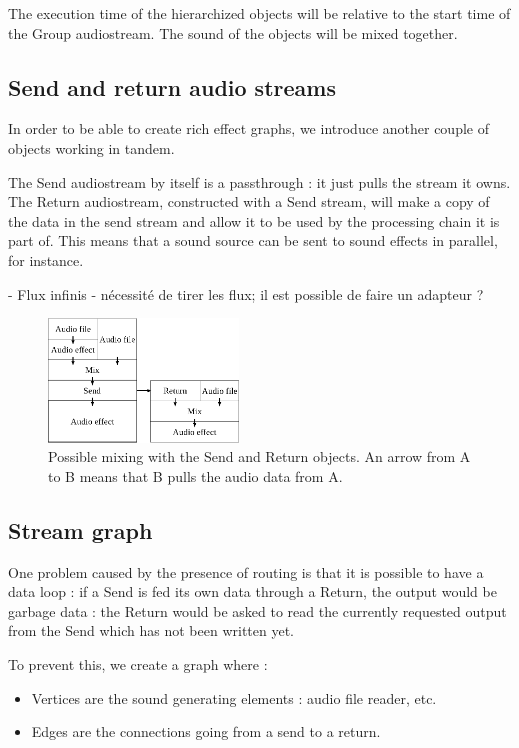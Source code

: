 \documentclass{article}
\begin{document}
The execution time of the hierarchized objects will be relative to the start time of the Group audiostream.
The sound of the objects will be mixed together.

\subsection{Send and return audio streams}
In order to be able to create rich effect graphs, we introduce another couple of objects 
working in tandem.

The Send audiostream by itself is a passthrough : it just pulls the stream it owns.
The Return audiostream, constructed with a Send stream, will make a copy of the data in 
the send stream and allow it to be used by the processing chain it is part of.
This means that a sound source can be sent to sound effects in parallel, for instance.

- Flux infinis
- nécessité de tirer les flux; il est possible de faire un adapteur ?

\begin{figure}
	\includegraphics[width=0.45\textwidth]{figures/graph2.eps}
	\caption{Possible mixing with the Send and Return objects. An arrow from A to B means that B pulls the audio data from A.}
\end{figure}


\subsection{Stream graph}
One problem caused by the presence of routing is that it is possible 
to have a data loop : if a Send is fed its own data through a Return, 
the output would be garbage data : the Return would be asked to read 
the currently requested output from the Send which has not been written yet.

To prevent this, we create a graph where : 
\begin{itemize}
	\item Vertices are the sound generating elements : audio file reader, etc.
	\item Edges are the connections going from a send to a return.
\end{itemize} 
\end{document}
